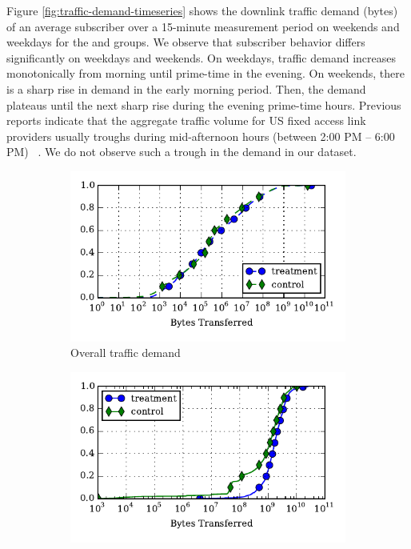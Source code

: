 Figure \ref{fig:traffic-demand-timeseries} shows the downlink traffic demand (bytes) of an average
subscriber over a 15-minute measurement period on weekends and weekdays for
the \treatment{} and \control{} groups. We observe that subscriber behavior differs
significantly on weekdays and weekends. On weekdays, traffic demand 
increases monotonically from morning until prime-time in the evening. On 
weekends, there is a sharp rise in demand in the early morning period. Then, the
demand plateaus until the next sharp rise during the evening prime-time hours.
Previous reports indicate that the aggregate traffic volume for US fixed access
link providers usually troughs during mid-afternoon hours (between 2:00 PM -- 6:00 PM)
~\cite{sandvine20141h}. We do not observe such a trough in the demand in our dataset.

\begin{figure}[t]
\begin{minipage}{1\linewidth}
\centering
%
\begin{subfigure}[b]{0.33\linewidth}
\includegraphics[width=\linewidth]{figures/cdf-all-bytes.pdf}
               \caption{Overall traffic demand\label{fig:CDF-data-rate}}
\end{subfigure}
%
\begin{subfigure}[b]{0.33\linewidth}
\includegraphics[width=\linewidth]{figures/cdf-per-device-max.pdf}

\end{subfigure}
\end{minipage}
\end{figure}

